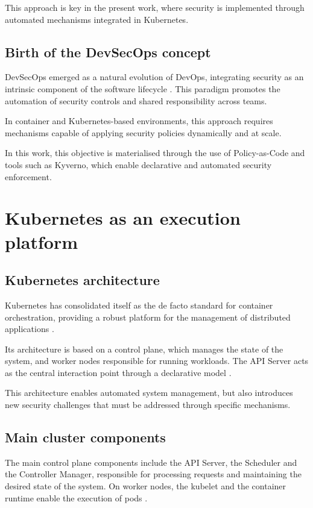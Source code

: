 This approach is key in the present work, where security is implemented through automated mechanisms integrated in Kubernetes.

\subsection{Birth of the DevSecOps concept}

DevSecOps emerged as a natural evolution of DevOps, integrating security as an intrinsic component of the software lifecycle \cite{mohan2016towards}. This paradigm promotes the automation of security controls and shared responsibility across teams.

In container and Kubernetes-based environments, this approach requires mechanisms capable of applying security policies dynamically and at scale.

In this work, this objective is materialised through the use of Policy-as-Code and tools such as Kyverno, which enable declarative and automated security enforcement.

\section{Kubernetes as an execution platform}

\subsection{Kubernetes architecture}

Kubernetes has consolidated itself as the de facto standard for container orchestration, providing a robust platform for the management of distributed applications \cite{burns2016borg}.

Its architecture is based on a control plane, which manages the state of the system, and worker nodes responsible for running workloads. The API Server acts as the central interaction point through a declarative model \cite{kubernetes_docs}.

This architecture enables automated system management, but also introduces new security challenges that must be addressed through specific mechanisms.

\subsection{Main cluster components}

The main control plane components include the API Server, the Scheduler and the Controller Manager, responsible for processing requests and maintaining the desired state of the system. On worker nodes, the kubelet and the container runtime enable the execution of pods \cite{kubernetes_docs}.


